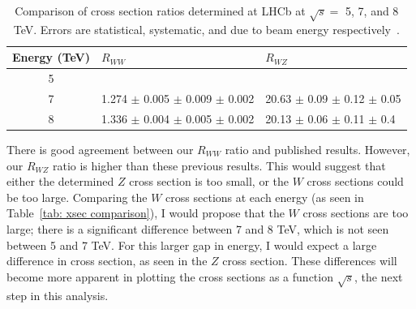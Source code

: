 \documentclass[a4paper]{article}
\begin{document}
\begin{table}[]
    \centering
    \begin{tabular}{c|ll}
        \hline
         Energy (TeV)   & $R_{WW}$ & $R_{WZ}$  \\
        \hline
         5              &   &   \\
         7              & 1.274 $\pm$ 0.005 $\pm$ 0.009 $\pm$ 0.002 & 20.63 $\pm$ 0.09 $\pm$ 0.12 $\pm$ 0.05  \\
         8              & 1.336 $\pm$ 0.004 $\pm$ 0.005 $\pm$ 0.002 & 20.13 $\pm$ 0.06 $\pm$ 0.11 $\pm$ 0.4   \\
         \hline
    \end{tabular}
    \caption{\small Comparison of cross section ratios determined at LHCb at $\sqrt{s} =$ 5, 7, and 8 TeV. Errors are statistical, systematic, and due to beam energy respectively~\cite{7TeV_Z_2015,8TeV_W+Z_2015}.}
    \label{tab: ratio comparison}
\end{table}

There is good agreement between our $R_{WW}$ ratio and published results. However, our $R_{WZ}$ ratio is higher than these previous results. This would suggest that either the determined $Z$ cross section is too small, or the $W$ cross sections could be too large. Comparing the $W$ cross sections at each energy (as seen in Table~\ref{tab: xsec comparison}), I would propose that the $W$ cross sections are too large; there is a significant difference between 7 and 8 TeV, which is not seen between 5 and 7 TeV. For this larger gap in energy, I would expect a large difference in cross section, as seen in the $Z$ cross section. These differences will become more apparent in plotting the cross sections as a function $\sqrt{s}$, the next step in this analysis.
\end{document}
